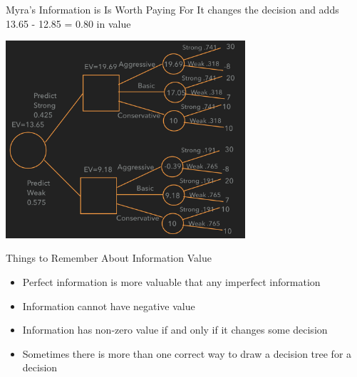 \documentclass{beamer}\usepackage[]{graphicx}\usepackage[]{color}
\begin{document}
\begin{darkframes}
    \begin{frame}[fragile]{Myra's Information is Is Worth Paying For}
       It changes the decision and adds 13.65 - 12.85 = 0.80 in value 
      \begin{center}
        \includegraphics[width=3.5in]{BevoImperfect} \\
      \end{center}

    \end{frame}


    \begin{frame}[fragile]{Things to Remember About Information Value}
       \fontsize{10}{10}\selectfont   
          \begin{itemize} [<+->]
            \item Perfect information is more valuable that any imperfect information
            \item Information cannot have negative value
            \item Information has non-zero value if and only if it changes some decision
            \item Sometimes there is more than one correct way to draw a decision tree for a decision
          \end{itemize}   
    \end{frame}

  \end{darkframes}
\end{document}
